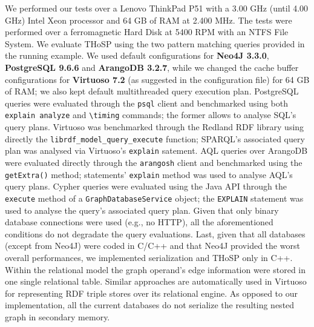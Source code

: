 We performed our tests over a Lenovo ThinkPad P51 with a 3.00 GHz (until 4.00 GHz) Intel Xeon processor and 64 GB of RAM at 2.400 MHz. The tests were performed over a ferromagnetic Hard Disk at 5400 RPM with an NTFS File System. We evaluate THoSP using the two pattern matching queries provided in the running example. 
We used default configurations for  \textbf{Neo4J 3.3.0}, \textbf{PostgreSQL 9.6.6} and \textbf{ArangoDB 3.2.7}, while we changed the cache buffer configurations for \textbf{Virtuoso 7.2} (as suggested in the configuration file) for 64 GB of RAM; we also kept  default multithreaded query execution plan. PostgreSQL queries were evaluated through the \texttt{psql} client and benchmarked using both \texttt{explain analyze} and \texttt{\textbackslash timing} commands; the former   allows to analyse SQL's query plans. Virtuoso was benchmarked through the Redland RDF library using directly the \texttt{librdf\_model\_query\_execute} function; SPARQL's associated query plan was analysed via Virtuoso's \texttt{explain} satement. 
AQL queries over {ArangoDB} were evaluated directly through the \texttt{arangosh} client and benchmarked using the \texttt{getExtra()} method; statements' \texttt{explain} method was used to analyse AQL's query plans. %
Cypher queries were evaluated using the Java API through the \texttt{execute} method of a \texttt{GraphDatabaseService} object; the \texttt{EX\-PLAIN} statement was used to analyse the query's associated query plan. Given that only binary database connections were used (e.g., no HTTP),
all the aforementioned conditions do not degradate the query evaluations. Last, given that all databases (except from Neo4J) were coded in C/C++ and that Neo4J provided the worst overall performances, we implemented  serialization and THoSP only in C++.
Within the relational model the graph operand's edge information were  stored in one single relational table. Similar approaches are automatically used in Virtuoso for representing RDF triple stores over its relational engine. As opposed to our implementation, all the current databases do not serialize the resulting nested graph in secondary memory.




